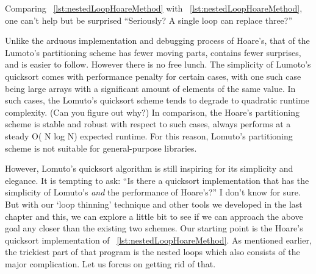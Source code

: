 Comparing ~\autoref{lst:nestedLoopHoareMethod} with ~\autoref{lst:nestedLoopHoareMethod},
one can't help but be surprised ``Seriously?
A single loop can replace three?''


Unlike the arduous implementation and debugging process of Hoare's,
that of the Lumoto's partitioning scheme has fewer moving parts, contains fewer surprises, and is
easier to follow.
However there is no free lunch.
The simplicity of Lumoto's quicksort comes with performance penalty
for certain cases, with one such case being large arrays with a significant amount of elements
of the same value.
In such cases,
the Lomuto's quicksort scheme tends to degrade to quadratic runtime complexity.
(Can you figure out why?)
In comparison, the Hoare's partitioning scheme is stable and
robust with respect to such cases, always performs at a steady O( N log N) expected runtime.
For this reason, Lomuto's partitioning scheme is not suitable for general-purpose libraries.


However, Lomuto's quicksort algorithm is still inspiring for its simplicity and elegance.
It is tempting to ask: ``Is there a quicksort implementation that has the simplicity of Lomuto's
\emph{and} the performance of Hoare's?''
I don't know for sure.
But with our `loop thinning' technique and other tools we developed in the last chapter and this, we
can explore a little bit to see if we can approach the above goal any closer than the existing
two schemes.
Our starting point is the Hoare's quicksort implementation of ~\autoref{lst:nestedLoopHoareMethod}.
As mentioned earlier, the trickiest part of that program is the nested loops which also consists
of the major complication.
Let us forcus on getting rid of that.


